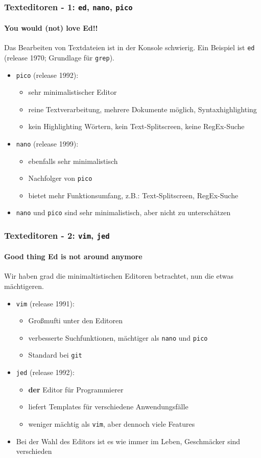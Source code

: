 \documentclass[12pt,utf8]{beamer}
\begin{document}
\begin{frame}
	\frametitle{Texteditoren - 1: \texttt{ed}, \texttt{nano}, \texttt{pico}}
	\framesubtitle{\textcolor{ownDarkOr}{You would (not) love Ed!!}}
	Das Bearbeiten von Textdateien ist in der Konsole schwierig. Ein Beispiel ist \texttt{ed} (release 1970; Grundlage für \texttt{grep}).
	\begin{itemize}
		\item \texttt{pico} (release 1992):
		\begin{itemize}[<+->]
			\item {\scriptsize sehr minimalistischer Editor}
			\item {\scriptsize reine Textverarbeitung, mehrere Dokumente möglich, Syntaxhighlighting}
			\item {\scriptsize kein Highlighting Wörtern, kein Text-Splitscreen, keine RegEx-Suche}
		\end{itemize}
		\item \texttt{nano} (release 1999):
		\begin{itemize}[<+->]
			\item {\scriptsize ebenfalls sehr minimalistisch}
			\item {\scriptsize Nachfolger von \texttt{pico}}
			\item {\scriptsize bietet mehr Funktionsumfang, z.B.: Text-Splitscreen, RegEx-Suche}
		\end{itemize}
		\item \texttt{nano} und \texttt{pico} sind sehr minimalistisch, aber nicht zu unterschätzen
	\end{itemize}
\end{frame}

\begin{frame}
	\frametitle{Texteditoren - 2: \texttt{vim}, \texttt{jed}}
	\framesubtitle{\textcolor{ownDarkOr}{Good thing Ed is not around anymore}}
	Wir haben grad die minimaltistischen Editoren betrachtet, nun die etwas mächtigeren.
	\begin{itemize}
		\item \texttt{vim} (release 1991):
		\begin{itemize}[<+->]
			\item Großmufti unter den Editoren
			\item verbesserte Suchfunktionen, mächtiger als \texttt{nano} und \texttt{pico}
			\item Standard bei \texttt{git}
		\end{itemize}
		\item \texttt{jed} (release 1992):
		\begin{itemize}[<+->]
			\item \textbf{der} Editor für Programmierer
			\item liefert Templates für verschiedene Anwendungsfälle
			\item weniger mächtig als \texttt{vim}, aber dennoch viele Features
		\end{itemize}
		\item Bei der Wahl des Editors ist es wie immer im Leben, Geschmäcker sind verschieden
	\end{itemize}
\end{frame}
\end{document}

